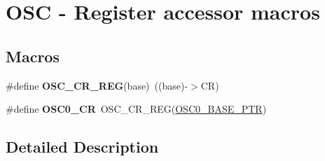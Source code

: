 \hypertarget{group___o_s_c___register___accessor___macros}{}\section{O\+SC -\/ Register accessor macros}
\label{group___o_s_c___register___accessor___macros}
\subsection*{Macros}
\begin{DoxyCompactItemize}
\item 
\mbox{\label{group___o_s_c___register___accessor___macros_gabcb7eab28c1f1c1d2b742a84f826de10}} 
\#define {\bfseries O\+S\+C\+\_\+\+C\+R\+\_\+\+R\+EG}(base)~((base)-\/$>$CR)
\item 
\mbox{\label{group___o_s_c___register___accessor___macros_ga55e7ae8d61b1c66e1c673163c8c0a10e}} 
\#define {\bfseries O\+S\+C0\+\_\+\+CR}~O\+S\+C\+\_\+\+C\+R\+\_\+\+R\+EG(\hyperlink{group___o_s_c___peripheral_gaab1618c69a91b2e5d3385139b5b566f0}{O\+S\+C0\+\_\+\+B\+A\+S\+E\+\_\+\+P\+TR})
\end{DoxyCompactItemize}


\subsection{Detailed Description}

